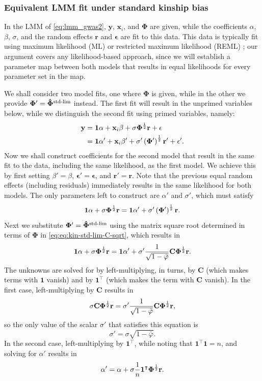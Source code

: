 \documentclass[11pt]{article}
\newcommand{\kinMat}{%
  \ensuremath{%
    \mathbf{\Phi}
  }%
  \xspace%
}%
\newcommand{\kinMatStdLim}{%
  \ensuremath{%
    \mathbf{\hat{\Phi}}^\text{std-lim}
  }%
  \xspace%
}%
\begin{document}
\subsubsection{Equivalent LMM fit under standard kinship bias}

In the LMM of \cref{eq:lmm_gwas2}, $\mathbf{y}$, $\mathbf{x}_i$, and \kinMat are given, while the coefficients $\alpha$, $\beta$, $\sigma$, and the random effects $\mathbf{r}$ and $\mathbf{\epsilon}$ are fit to this data.
This data is typically fit using maximum likelihood (ML) or restricted maximum likelihood (REML) \citep{kang_efficient_2008}; our argument covers any likelihood-based approach, since we will establish a parameter map between both models that results in equal likelihoods for every parameter set in the map.

We shall consider two model fits, one where \kinMat is given, while in the other we provide $\kinMat' = \kinMatStdLim$ instead.
The first fit will result in the unprimed variables below, while we distinguish the second fit using primed variables, namely:
\begin{align*}
  \mathbf{y}
  &=
    \mathbf{1} \alpha + \mathbf{x}_i \beta + \sigma \kinMat^\frac{1}{2} \mathbf{r} + \mathbf{\epsilon}
  \\
  &=
    \mathbf{1} \alpha' + \mathbf{x}_i \beta' + \sigma' \left( \kinMat' \right)^\frac{1}{2} \mathbf{r}' + \mathbf{\epsilon}'
    .
\end{align*}
Now we shall construct coefficients for the second model that result in the same fit to the data, including the same likelihood, as the first model.
We achieve this by first setting
$\beta' = \beta$,
$\mathbf{\epsilon}' = \mathbf{\epsilon}$,
and
$\mathbf{r}' = \mathbf{r}$.
Note that the previous equal random effects (including residuals) immediately results in the same likelihood for both models.
The only parameters left to construct are $\alpha'$ and $\sigma'$, which must satisfy
$$
\mathbf{1} \alpha  + \sigma \kinMat^\frac{1}{2} \mathbf{r}
=
\mathbf{1} \alpha' + \sigma' \left( \kinMat' \right)^\frac{1}{2} \mathbf{r}
.
$$
Next we substitute $\kinMat' = \kinMatStdLim$ using the matrix square root determined in terms of \kinMat in \cref{eq:eq:kin-std-lim-C-sqrt}, which results in
$$
\mathbf{1} \alpha  + \sigma \kinMat^\frac{1}{2} \mathbf{r}
=
\mathbf{1} \alpha' + \sigma'
\frac{1}{ \sqrt{ 1 - \bar{\varphi} } }
\mathbf{C} \kinMat^\frac{1}{2}
\mathbf{r}
.
$$
The unknowns are solved for by left-multiplying, in turns, by $\mathbf{C}$ (which makes terms with $\mathbf{1}$ vanish) and by $\mathbf{1}^\intercal$ (which makes the term with $\mathbf{C}$ vanish).
In the first case, left-multiplying by $\mathbf{C}$ results in
$$
\sigma \mathbf{C} \kinMat^\frac{1}{2} \mathbf{r}
=
\sigma'
\frac{1}{ \sqrt{ 1 - \bar{\varphi} } }
\mathbf{C} \kinMat^\frac{1}{2}
\mathbf{r}
,
$$
so the only value of the scalar $\sigma'$ that satisfies this equation is
$$
\sigma'
=
\sigma \sqrt{ 1 - \bar{\varphi} }
.
$$
In the second case, left-multiplying by $\mathbf{1}^\intercal$, while noting that $\mathbf{1}^\intercal \mathbf{1} = n$, and solving for $\alpha'$ results in
$$
\alpha'
=
\alpha  + \sigma \frac{1}{n} \mathbf{1}^\intercal \kinMat^\frac{1}{2} \mathbf{r}
.
$$
\end{document}
